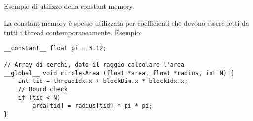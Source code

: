 \begin{questions}
    \question Esempio di utilizzo della constant memory.
    
    \begin{solution}
        La constant memory è spesso utilizzata per coefficienti che devono essere letti da tutti i thread contemporaneamente. Esempio:
        \begin{verbatim}
__constant__ float pi = 3.12;

// Array di cerchi, dato il raggio calcolare l'area
__global__ void circlesArea (float *area, float *radius, int N) {
    int tid = threadIdx.x + blockDim.x * blockIdx.x;
    // Bound check
    if (tid < N)
        area[tid] = radius[tid] * pi * pi;
}
        \end{verbatim}
    \end{solution}
\end{questions}